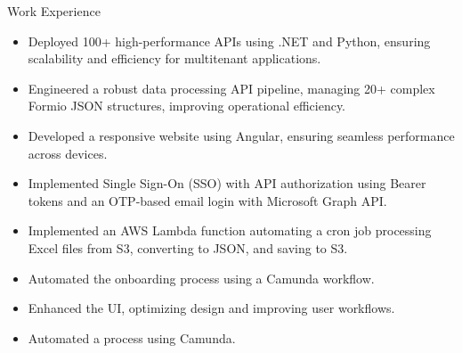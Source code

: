 \documentclass{resume}
\begin{document}
\begin{experienceSection}{Work Experience}
    \experienceItem[
        company={EXL Digital},
        location={Noida Sec-144},
        position={FullStack Developer},
        duration={Aug 2023 -- Present}
    ]
    \begin{itemize}
        \item Deployed 100+ high-performance APIs using .NET and Python, ensuring scalability and efficiency for multitenant applications.
        \item Engineered a robust data processing API pipeline, managing 20+ complex Formio JSON structures, improving operational efficiency.
        \item Developed a responsive website using Angular, ensuring seamless performance across devices.
        \item Implemented Single Sign-On (SSO) with API authorization using Bearer tokens and an OTP-based email login with Microsoft Graph API.
        \item Implemented an AWS Lambda function automating a cron job processing Excel files from S3, converting to JSON, and saving to S3.
        \item Automated the onboarding process using a Camunda workflow.
    \end{itemize}
    \experienceItem[
        company={Nokia},
        location={Chennai},
        position={Web Developer Intern},
        duration={Jun 2018 -- Jul 2018}
    ]
    \begin{itemize}
        \item Enhanced the UI, optimizing design and improving user workflows.
        \item Automated a process using Camunda.
    \end{itemize}
\end{experienceSection}
\end{document}
